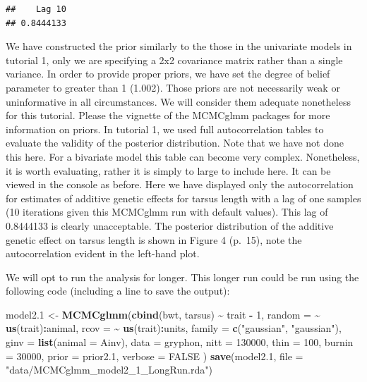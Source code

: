 \documentclass[
  12pt,
]{book}
\newenvironment{Shaded}{\begin{snugshade}}{\end{snugshade}}
\newcommand{\DataTypeTok}[1]{\textcolor[rgb]{0.13,0.29,0.53}{#1}}
\newcommand{\DecValTok}[1]{\textcolor[rgb]{0.00,0.00,0.81}{#1}}
\newcommand{\FloatTok}[1]{\textcolor[rgb]{0.00,0.00,0.81}{#1}}
\newcommand{\KeywordTok}[1]{\textcolor[rgb]{0.13,0.29,0.53}{\textbf{#1}}}
\newcommand{\NormalTok}[1]{#1}
\newcommand{\OperatorTok}[1]{\textcolor[rgb]{0.81,0.36,0.00}{\textbf{#1}}}
\newcommand{\OtherTok}[1]{\textcolor[rgb]{0.56,0.35,0.01}{#1}}
\newcommand{\StringTok}[1]{\textcolor[rgb]{0.31,0.60,0.02}{#1}}
\begin{document}
\begin{verbatim}
##    Lag 10 
## 0.8444133
\end{verbatim}

We have constructed the prior similarly to the those in the univariate models in tutorial 1, only we are specifying a 2x2 covariance matrix rather than a single variance. In order to provide proper priors, we have set the degree of belief parameter to greater than 1 (1.002). Those priors are not necessarily weak or uninformative in all circumstances. We will consider them adequate nonetheless for this tutorial. Please the vignette of the MCMCglmm packages \citep{R-MCMCglmm} for more information on priors. In tutorial 1, we used full autocorrelation tables to evaluate the validity of the posterior distribution. Note that we have not done this here.
For a bivariate model this table can become very complex. Nonetheless, it is worth evaluating, rather it is simply to large to include here. It can be viewed in the console as before. Here we have displayed only the autocorrelation for estimates of additive genetic effects for tarsus length with a lag of one samples (10 iterations given this MCMCglmm run with default values). This lag of 0.8444133 is clearly unacceptable. The posterior distribution of the additive genetic effect on tarsus length is shown in Figure 4 (p.~15), note the autocorrelation evident in the left-hand plot.

We will opt to run the analysis for longer. This longer run could be run using the following code (including a line to save the output):

\begin{Shaded}
\begin{Highlighting}[]
\NormalTok{model2}\FloatTok{.1}\NormalTok{ \textless{}{-}}\StringTok{ }\KeywordTok{MCMCglmm}\NormalTok{(}\KeywordTok{cbind}\NormalTok{(bwt, tarsus) }\OperatorTok{\textasciitilde{}}\StringTok{ }\NormalTok{trait }\OperatorTok{{-}}\StringTok{ }\DecValTok{1}\NormalTok{,}
  \DataTypeTok{random =} \OperatorTok{\textasciitilde{}}\StringTok{ }\KeywordTok{us}\NormalTok{(trait)}\OperatorTok{:}\NormalTok{animal,}
  \DataTypeTok{rcov =} \OperatorTok{\textasciitilde{}}\StringTok{ }\KeywordTok{us}\NormalTok{(trait)}\OperatorTok{:}\NormalTok{units,}
  \DataTypeTok{family =} \KeywordTok{c}\NormalTok{(}\StringTok{"gaussian"}\NormalTok{, }\StringTok{"gaussian"}\NormalTok{),}
  \DataTypeTok{ginv =} \KeywordTok{list}\NormalTok{(}\DataTypeTok{animal =}\NormalTok{ Ainv),}
  \DataTypeTok{data =}\NormalTok{ gryphon,}
  \DataTypeTok{nitt =} \DecValTok{130000}\NormalTok{, }\DataTypeTok{thin =} \DecValTok{100}\NormalTok{, }\DataTypeTok{burnin =} \DecValTok{30000}\NormalTok{,}
  \DataTypeTok{prior =}\NormalTok{ prior2}\FloatTok{.1}\NormalTok{, }\DataTypeTok{verbose =} \OtherTok{FALSE}
\NormalTok{)}
\KeywordTok{save}\NormalTok{(model2}\FloatTok{.1}\NormalTok{, }\DataTypeTok{file =} \StringTok{"data/MCMCglmm\_model2\_1\_LongRun.rda"}\NormalTok{)}
\end{Highlighting}
\end{Shaded}
\end{document}
